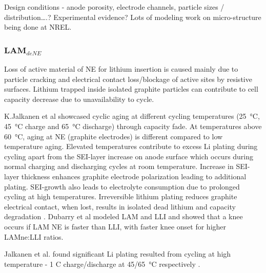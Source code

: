 \documentclass{article}
\begin{document}
Design conditions - anode porosity, electrode channels, particle sizes / distribution….? Experimental evidence? Lots of modeling work on micro-structure being done at NREL.

\subsubsection{$\textbf{LAM}_{deNE}$}

Loss of active material of NE for lithium insertion is caused mainly due to particle cracking and electrical contact loss/blockage of active sites by resistive surfaces. Lithium trapped inside isolated graphite particles can contribute to cell capacity decrease due to unavailability to cycle. 

K.Jalkanen et al \cite{jalkanen_cycle_2015} showcased cyclic aging at different cycling temperatures (\SI{25}{\celsius}, \SI{45}{\celsius} charge and \SI{65}{\celsius} discharge) through capacity fade. At temperatures above \SI{60}{\celsius}, aging at NE (graphite electrodes) is different compared to low temperature aging. Elevated temperatures contribute to excess Li plating during  cycling apart from the SEI-layer increase on anode surface which occurs during normal charging and discharging cycles at room temperature. Increase in SEI-layer thickness enhances graphite electrode polarization leading to additional plating. SEI-growth also leads to electrolyte consumption due to prolonged cycling at high temperatures. Irreversible lithium plating reduces graphite electrical contact, when lost, results in isolated dead lithium and capacity degradation \cite{petzl_lithium_2015}.  
Dubarry et al \cite{dubarry_durability_2018} modeled LAM and LLI and showed that a knee occurs if LAM NE is faster than LLI, with faster knee onset for higher LAMne:LLI ratios.


Jalkanen et al. found significant Li plating resulted from cycling at high temperature - 1 C charge/discharge at \SI{45/65}{\celsius} respectively \cite{jalkanen_cycle_2015}. 
\end{document}
